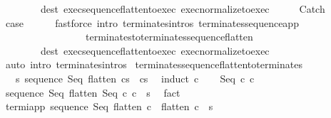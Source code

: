 \begin{isabellebody}
\ \ \ \ \ \ \ \ dest{\isacharcolon}\ exec{\isacharunderscore}sequence{\isacharunderscore}flatten{\isacharunderscore}to{\isacharunderscore}exec\ exec{\isacharunderscore}normalize{\isacharunderscore}to{\isacharunderscore}exec{\isacharparenright}\isanewline
{}\isamarkupfalse%
\ \isanewline
\ \ \isamarkupfalse%
\ Catch\isanewline
\ \ \isamarkupfalse%
\ {\isacharquery}case\isanewline
\ \ \ \ \isamarkupfalse%
\ {\isacharparenleft}fastforce\ intro{\isacharcolon}\ terminates{\isachardot}intros\ terminates{\isacharunderscore}sequence{\isacharunderscore}app\isanewline
\ \ \ \ \ \ \ \ \ \ \ \ \ \ \ \ \ terminates{\isacharunderscore}to{\isacharunderscore}terminates{\isacharunderscore}sequence{\isacharunderscore}flatten\isanewline
\ \ \ \ \ \ \ \ dest{\isacharcolon}\ exec{\isacharunderscore}sequence{\isacharunderscore}flatten{\isacharunderscore}to{\isacharunderscore}exec\ exec{\isacharunderscore}normalize{\isacharunderscore}to{\isacharunderscore}exec{\isacharparenright}\isanewline
{}\isamarkupfalse%
\ {\isacharparenleft}auto\ intro{\isacharcolon}\ terminates{\isachardot}intros{\isacharparenright}%
\endisatagproof
{\isafoldproof}%
%
\isadelimproof
\isanewline
%
\endisadelimproof
\isanewline
{}\isamarkupfalse%
\ terminates{\isacharunderscore}sequence{\isacharunderscore}flatten{\isacharunderscore}to{\isacharunderscore}terminates{\isacharcolon}\ \isanewline
\ \ \ {\isachardoublequoteopen}{\isasymAnd}s{\isachardot}\ {\isasymGamma}{\isasymturnstile}sequence\ Seq\ {\isacharparenleft}flatten\ c{\isacharparenright}{\isasymdown}s\ {\isasymLongrightarrow}\ {\isasymGamma}{\isasymturnstile}c{\isasymdown}s{\isachardoublequoteclose}\ \isanewline
%
\isadelimproof
%
\endisadelimproof
%
\isatagproof
{}\isamarkupfalse%
\ {\isacharparenleft}induct\ c{\isacharparenright}\isanewline
\ \ \isamarkupfalse%
\ {\isacharparenleft}Seq\ c{}\ c{}{\isacharparenright}\isanewline
\ \ \isamarkupfalse%
\ {\isachardoublequoteopen}{\isasymGamma}{\isasymturnstile}sequence\ Seq\ {\isacharparenleft}flatten\ {\isacharparenleft}Seq\ c{}\ c{}{\isacharparenright}{\isacharparenright}\ {\isasymdown}\ s{\isachardoublequoteclose}\ \isamarkupfalse%
\ fact\isanewline
\ \ \isamarkupfalse%
\ termi{\isacharunderscore}app{\isacharcolon}\ {\isachardoublequoteopen}{\isasymGamma}{\isasymturnstile}sequence\ Seq\ {\isacharparenleft}flatten\ c{}\ {\isacharat}\ flatten\ c{}{\isacharparenright}\ {\isasymdown}\ s{\isachardoublequoteclose}\ \isamarkupfalse%

\end{isabellebody}
